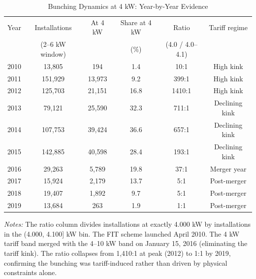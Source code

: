 \begin{table}[t]
\centering
\caption{Bunching Dynamics at 4 kW: Year-by-Year Evidence}
\label{tab:dynamics}
\begin{tabular}{lccccc}
\toprule
Year & Installations & At 4 kW & Share at 4 kW & Ratio & Tariff regime \\
 & (2--6 kW window) & & (\%) & (4.0 / 4.0--4.1) & \\
\midrule
2010 & 13,805 & 194 & 1.4 & 10:1 & High kink \\
2011 & 151,929 & 13,973 & 9.2 & 399:1 & High kink \\
2012 & 125,703 & 21,151 & 16.8 & 1410:1 & High kink \\
2013 & 79,121 & 25,590 & 32.3 & 711:1 & Declining kink \\
2014 & 107,753 & 39,424 & 36.6 & 657:1 & Declining kink \\
2015 & 142,885 & 40,598 & 28.4 & 193:1 & Declining kink \\
2016 & 29,263 & 5,789 & 19.8 & 37:1 & Merger year \\
2017 & 15,924 & 2,179 & 13.7 & 5:1 & Post-merger \\
2018 & 19,407 & 1,892 & 9.7 & 5:1 & Post-merger \\
2019 & 13,684 & 263 & 1.9 & 1:1 & Post-merger \\
\bottomrule
\end{tabular}
\par\vspace{0.3em}\begin{flushleft}\small
\textit{Notes:} The ratio column divides installations at exactly 4.000 kW by installations in the (4.000, 4.100] kW bin. The FIT scheme launched April 2010. The 4 kW tariff band merged with the 4--10 kW band on January 15, 2016 (eliminating the tariff kink). The ratio collapses from 1,410:1 at peak (2012) to 1:1 by 2019, confirming the bunching was tariff-induced rather than driven by physical constraints alone.
\end{flushleft}
\end{table}

